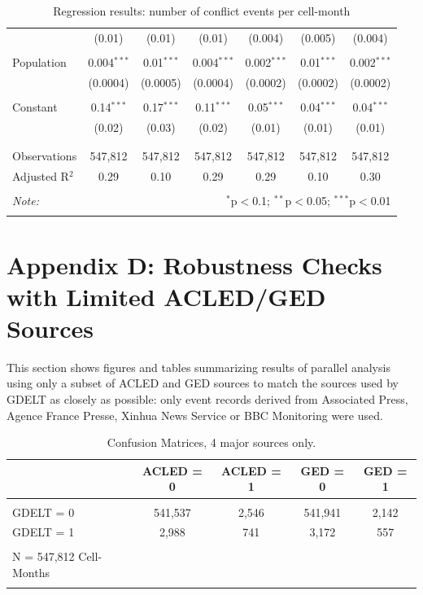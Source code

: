 \documentclass[hidelinks]{article}
\begin{document}
\begin{table}[!htbp]
\begin{tabular}{@{\extracolsep{5pt}}lcccccc}
  & (0.01) & (0.01) & (0.01) & (0.004) & (0.005) & (0.004) \\ 
  & & & & & & \\ 
Population & 0.004$^{***}$ & 0.01$^{***}$ & 0.004$^{***}$ & 0.002$^{***}$ & 0.01$^{***}$ & 0.002$^{***}$ \\ 
  & (0.0004) & (0.0005) & (0.0004) & (0.0002) & (0.0002) & (0.0002) \\ 
  & & & & & & \\ 
 Constant & 0.14$^{***}$ & 0.17$^{***}$ & 0.11$^{***}$ & 0.05$^{***}$ & 0.04$^{***}$ & 0.04$^{***}$ \\ 
  & (0.02) & (0.03) & (0.02) & (0.01) & (0.01) & (0.01) \\ 
  & & & & & & \\ 
\hline \\[-1.8ex] 
Observations & 547,812 & 547,812 & 547,812 & 547,812 & 547,812 & 547,812 \\ 
Adjusted R$^{2}$ & 0.29 & 0.10 & 0.29 & 0.29 & 0.10 & 0.30 \\ 
\hline 
\hline \\[-1.8ex] 
\textit{Note:}  & \multicolumn{6}{r}{$^{*}$p$<$0.1; $^{**}$p$<$0.05; $^{***}$p$<$0.01} \\ 
\normalsize 
\end{tabular} 
\caption{Regression results: number of conflict events per cell-month}
\end{table} 


\pagebreak

\section*{Appendix D: Robustness Checks with Limited ACLED/GED Sources}
This section shows figures and tables summarizing results of parallel analysis using only a subset of ACLED and GED sources to match the sources used by GDELT as closely as possible: only event records derived from Associated Press, Agence France Presse, Xinhua News Service or BBC Monitoring were used.


\begin{table}[!htbp] \centering 
\begin{tabular}{@{\extracolsep{5pt}}lcc|cc} 
& \multicolumn{1}{c}{ACLED = 0} & \multicolumn{1}{c}{ACLED = 1} & \multicolumn{1}{c}{GED = 0} & \multicolumn{1}{c}{GED = 1} \\ 
\hline \\[-1.8ex] 
GDELT = 0 & 541,537 & 2,546  & 541,941 & 2,142\\ 
GDELT = 1 & 2,988 & 741  & 3,172 & 557 \\ 
\hline \\[-1.8ex] 
N = 547,812 Cell-Months\\
\normalsize 
\end{tabular} 
 \caption{Confusion Matrices, 4 major sources only.}\label{tab:confusion}
\end{table} 
\end{document}
